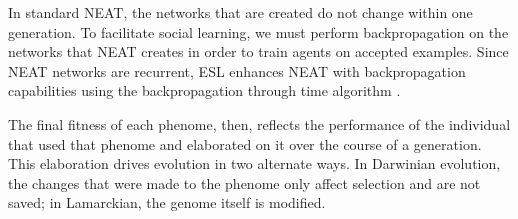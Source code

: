 \documentclass{sig-alternate}
\begin{document}
In standard NEAT, the networks that are created do not change within one generation. To facilitate social learning, we must perform backpropagation \cite{rumelhart1986learning} on the networks that NEAT creates in order to train agents on accepted examples. Since NEAT networks are recurrent, ESL enhances NEAT with backpropagation capabilities using the backpropagation through time algorithm \cite{werbos1990backpropagation} .

The final fitness of each phenome, then, reflects the performance of the individual that used that phenome and elaborated on it over the course of a generation. This elaboration drives evolution in two alternate ways.  In Darwinian evolution, the changes that were made to the phenome only affect selection and are not saved; in Lamarckian, the genome itself is modified.
\end{document}
